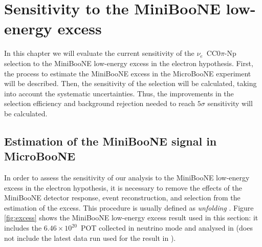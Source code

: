 \chapter{Sensitivity to the MiniBooNE low-energy excess}\label{sec:sensitivity}

\minitoc

In this chapter we will evaluate the current sensitivity of the $\nu_e$~CC0$\pi$-Np selection to the MiniBooNE low-energy excess in the electron hypothesis. First, the process to estimate the MiniBooNE excess in the MicroBooNE experiment will be described. Then, the sensitivity of the selection will be calculated, taking into account the systematic uncertainties. Thus, the improvements in the selection efficiency and background rejection needed to reach $5\sigma$ sensitivity will be calculated.

\section{Estimation of the MiniBooNE signal in MicroBooNE}
In order to assess the sensitivity of our analysis to the MiniBooNE low-energy excess in the electron hypothesis, it is necessary to remove the effects of the MiniBooNE detector response, event reconstruction, and selection from the estimation of the excess. This procedure is usually defined as \emph{unfolding} \cite{lee_unfolding}. 
Figure \ref{fig:excess} shows the MiniBooNE low-energy excess result used in this section: it includes the $6.46\times10^{20}$~POT collected in neutrino mode and analysed in \cite{AguilarArevalo:2007it} (does not include the latest data run used for the result in \cite{Aguilar-Arevalo:2018gpe}).

